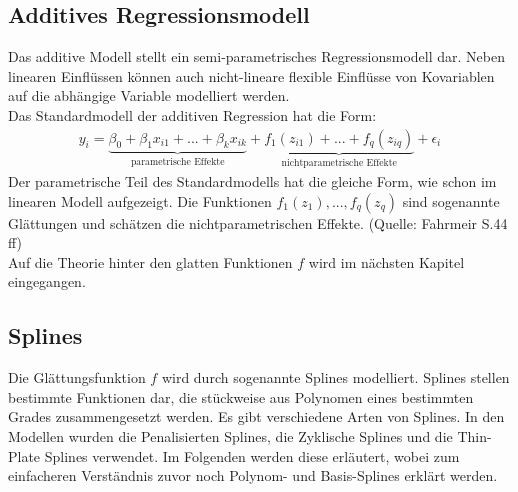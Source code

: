 \subsection{Additives Regressionsmodell}
Das additive Modell stellt ein semi-parametrisches Regressionsmodell dar. Neben linearen Einflüssen können auch nicht-lineare flexible Einﬂüsse von Kovariablen auf die abhängige Variable modelliert werden. \\
Das Standardmodell der additiven Regression hat die Form:
\begin{align}
y_{i}=\underbrace{\beta_{0}+\beta_{1}x_{i1}+...+\beta_{k}x_{ik}}_{\text{parametrische Effekte}}+ \underbrace{f_{1}(z_{i1})+...+f_{q}(z_{iq})}_{\text{nichtparametrische Effekte}}+\epsilon_{i}
\end{align}
Der parametrische Teil des Standardmodells hat die gleiche Form, wie schon im linearen Modell aufgezeigt. Die Funktionen $f_{1}(z_{1}),...,f_{q}(z_{q})$ sind sogenannte Glättungen und schätzen die nichtparametrischen Effekte. (Quelle: Fahrmeir S.44 ff) \\
Auf die Theorie hinter den glatten Funktionen $f$ wird im nächsten Kapitel eingegangen.

\subsection{Splines}
Die Glättungsfunktion $f$ wird durch sogenannte Splines modelliert. Splines stellen bestimmte Funktionen dar, die stückweise aus Polynomen eines bestimmten Grades zusammengesetzt werden. Es gibt verschiedene Arten von Splines. In den Modellen wurden die Penalisierten Splines, die Zyklische Splines und die Thin-Plate Splines verwendet. Im Folgenden werden diese erläutert, wobei zum einfacheren Verständnis zuvor noch Polynom- und Basis-Splines erklärt werden.

